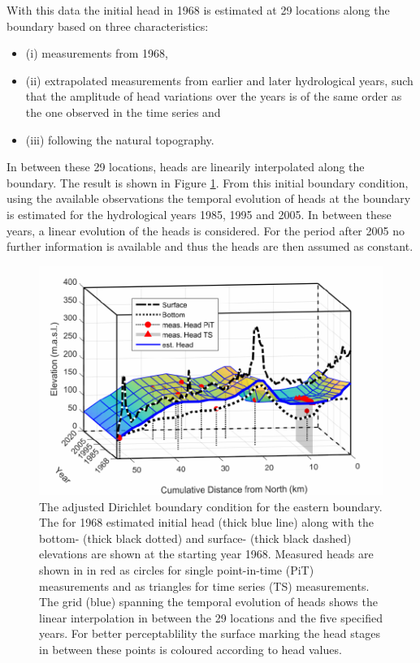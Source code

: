 With this data the initial head in 1968 is estimated at 29 locations along the boundary based on three characteristics:
    \begin{itemize}
        \item (i) measurements from 1968,
        \item (ii) extrapolated measurements from earlier and later hydrological years, such that the amplitude of head variations over the years is of the same order as the one observed in the time series and
        \item (iii) following the natural topography.
    \end{itemize}

In between these 29 locations, heads are linearily interpolated along the boundary. The result is shown in Figure \ref{Fig-EastB}. From this initial boundary condition, using the available observations the temporal evolution of heads at the boundary is estimated for the hydrological years 1985, 1995 and 2005. In between these years, a linear evolution of the heads is considered. For the period after 2005 no further information is available and thus the heads are then assumed as constant.

\begin{figure}[h]
    \centering
    \includegraphics{./img/Fig-EasternBoundary.pdf}
    \caption{The adjusted Dirichlet boundary condition for the eastern boundary. The for 1968 estimated initial head (thick blue line) along with the bottom- (thick black dotted) and surface- (thick black dashed) elevations are shown at the starting year 1968. Measured heads are shown in in red as circles for single point-in-time (PiT) measurements and as triangles for time series (TS) measurements. The grid (blue) spanning the temporal evolution of heads shows the linear interpolation in between the 29 locations and the five specified years. For better perceptablility the surface marking the head stages in between these points is coloured according to head values.}
    \label{Fig-EastB}
\end{figure}

